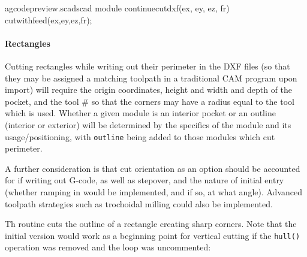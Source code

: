 \documentclass{ltxdoc}
\begin{document}
\lstset{firstnumber=\thegcpscad}
\begin{writecode}{a}{gcodepreview.scad}{scad}
module continuecutdxf(ex, ey, ez, fr) {
  cutwithfeed(ex,ey,ez,fr);
}

\end{writecode}
\addtocounter{gcpscad}{4}

\paragraph{Rectangles}

Cutting rectangles while writing out their perimeter in the DXF files (so that they may
be assigned a matching toolpath in a traditional CAM program upon import) will require
the origin coordinates, height and width and depth of the pocket, and the tool \# so
that the corners may have a radius equal to the tool which is used. Whether a given module
is an interior pocket or an outline (interior or exterior) will be determined by the
specifics of the module and its usage/positioning, with \texttt{outline} being added to 
those modules which cut perimeter.

A further consideration is that cut orientation as an option should be accounted for
if writing out G-code, as well as stepover, and the nature of initial
entry (whether ramping in would be implemented, and if so, at what angle). Advanced 
toolpath strategies such as trochoidal milling could also be implemented.

Th routine %
cuts the outline of a rectangle creating sharp corners. Note that the initial 
version would work as a beginning point for vertical cutting if the \texttt{hull()} operation 
was removed and the loop was uncommented:
 
\end{document}
